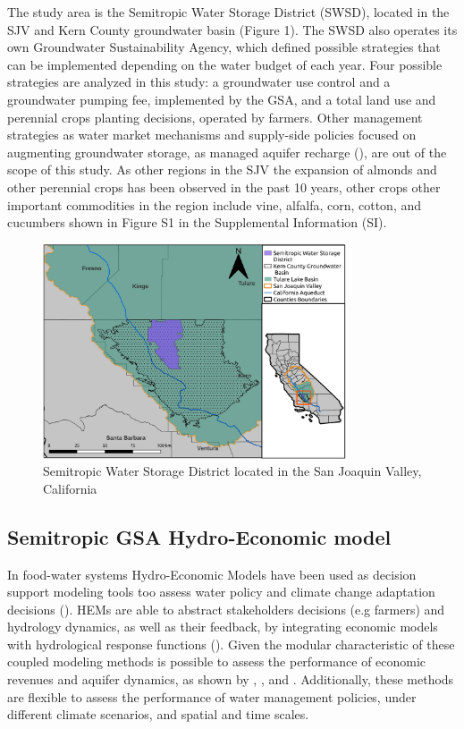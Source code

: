 \documentclass[11pt,a4paper]{article}
\begin{document}
The study area is the Semitropic Water Storage District (SWSD), located in the SJV and Kern County groundwater basin (Figure 1). The SWSD also operates its own Groundwater Sustainability Agency, which defined possible strategies that can be implemented depending on the water budget of each year. Four possible strategies are analyzed in this study: a groundwater use control and a groundwater pumping fee, implemented by the GSA, and a total land use and perennial crops planting decisions, operated by farmers. Other management strategies as water market mechanisms and supply-side policies focused on augmenting groundwater storage, as managed aquifer recharge (\cite{ulibarri_assessing_2021}), are out of the scope of this study. As other regions in the SJV the expansion of almonds and other perennial crops has been observed in the past 10 years, other crops other important commodities in the region include vine, alfalfa, corn, cotton, and cucumbers shown in Figure S1 in the Supplemental Information (SI).

\begin{figure}[H]
    \centering
    \includegraphics[width=0.8\textwidth]{Map_Semitropic.jpg}
    \caption{Semitropic Water Storage District located in the San Joaquin Valley, California}
    \label{fig:1}
\end{figure}

\subsection{Semitropic GSA Hydro-Economic model}

In food-water systems Hydro-Economic Models have been used as decision support modeling tools too assess water policy and climate change adaptation decisions (\cite{ward_hydroeconomic_2021,harou_hydro-economic_2009}). HEMs are able to abstract stakeholders decisions (e.g farmers) and hydrology dynamics, as well as their feedback, by integrating economic models with hydrological response functions (\cite{harou_hydro-economic_2009}). Given the modular characteristic of these coupled modeling methods is possible to assess the performance of economic revenues and aquifer dynamics, as shown by \textcite{macewan_hydroeconomic_2017}, \textcite{afshar_multi-objective_2020}, \textcite{rodriguez-flores_global_2022} and \textcite{graveline_combining_2020}. Additionally, these methods are flexible to assess the performance of water management policies, under different climate scenarios, and spatial and time scales.
\end{document}
